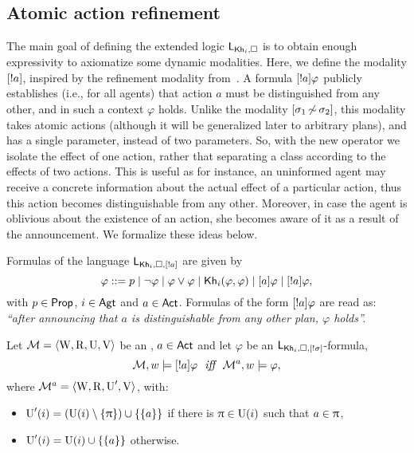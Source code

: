 \subsection{Atomic action refinement}
\label{subsec:atom-ref}

The main goal of defining the extended logic $\mathsf{L}_{{\sf Kh}_i,\square}$ is to obtain enough expressivity to axiomatize some dynamic modalities. Here, we define the modality $[!a]$, inspired by the refinement modality from~. A formula $[!a]\varphi$ publicly establishes (i.e., for all agents) that action $a$ must be distinguished from any other, and in such a context $\varphi$ holds. Unlike the modality $[{\sigma_1{\,\not\sim\,}\sigma_2}]$, this modality takes atomic actions (although it will be generalized later to arbitrary plans), and has a single parameter, instead of two parameters. So, with the new operator we isolate the effect of one action, rather that separating a class according to the effects of two actions. This is useful as for instance, an uninformed agent may receive a concrete information about the actual effect of a particular action, thus this action becomes distinguishable from any other. Moreover, in case the agent is oblivious about the existence of an action, she becomes aware of it as a result of the announcement. We formalize these ideas below.

\medskip

\begin{definition}\label{def:ssrefsyntax}
Formulas of the language $\mathsf{L}_{{\sf Kh}_i,\square,[!a]}$ are given by
\[
\varphi ::= p \mid \neg\varphi \mid \varphi\vee\varphi \mid {\sf Kh}_i(\varphi,\varphi) \mid [a]\varphi \mid [!a]\varphi,
\]
with $p \in {\rm \sf Prop}$, $i\in{\rm \sf Agt}$ and $a \in {\rm \sf Act}$. Formulas of the form $[!a]\varphi$ are read as: \emph{``after announcing that $a$ is distinguishable from any other plan, $\varphi$ holds''.} 
\end{definition}

\medskip

\begin{definition}\label{def:ssrefsemantics}
Let $\mathcal{M} = \langle \operatorname{W}, \operatorname{R}, \operatorname{U}, \operatorname{V} \rangle$ be an \ults, $a \in {\rm \sf Act}$ and let $\varphi$ be an  $\mathsf{L}_{{\sf Kh}_i,\square,[!\sigma]}$-formula,
\[
\modults,w \models \srefbox{a}\varphi \ \ \iff \ \ \modults^a,w \models \varphi,
\] 
where $\mathcal{M}^a = \langle \operatorname{W},\operatorname{R},\operatorname{U}',\operatorname{V} \rangle$, with:
\begin{itemize}
\item $\operatorname{U}'(i) = (\operatorname{U}(i) \setminus \{ \uppi \}) \cup \{ \{ a \} \}$ if there is $\uppi \in \operatorname{U}(i)$ such that $a \in \uppi$,
\item $\operatorname{U}'(i) = \operatorname{U}(i) \cup \{ \{ a \} \}$ otherwise.
\end{itemize}
\end{definition}


